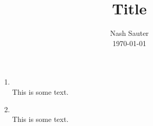 \documentclass[12pt]{amsart}
\title{Title}
\author{Nash Sauter\\\today}
\begin{document}
\maketitle

\begin{enumerate}

\item {} \medskip \\ 
This is some text.
\medskip \\

\item {} \medskip \\
This is some text.
\medskip \\

\end{enumerate}
\end{document}
